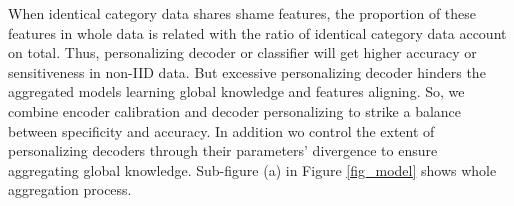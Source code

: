 \documentclass[journal]{IEEEtran}
\begin{document}
When identical category data shares shame features, the proportion of these features in whole data is related with the ratio of identical category data account on total. Thus, personalizing decoder or classifier will get higher accuracy or sensitiveness in non-IID data. But excessive personalizing decoder hinders the aggregated models learning global knowledge and features aligning. So, we combine encoder calibration and decoder personalizing to strike a balance between specificity and accuracy. In addition wo control the extent of personalizing decoders through their parameters' divergence to ensure aggregating global knowledge. Sub-figure (a) in Figure \ref{fig_model} shows whole aggregation process.


\end{document}
